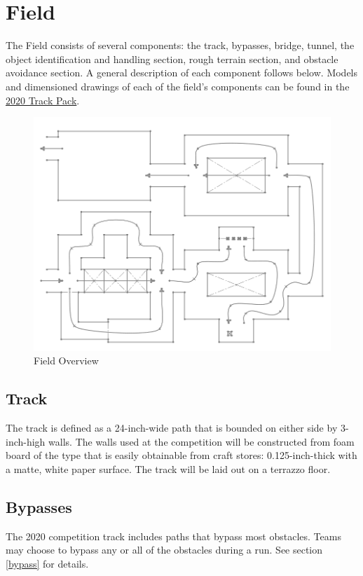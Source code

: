 \section{Field}
The Field consists of several components: the track, bypasses, bridge, tunnel, the object identification and handling section, rough terrain section, and obstacle avoidance section. A general description of each component follows below. Models and dimensioned drawings of each of the field’s components can be found in the {\href{https://mercury.okstate.edu/content/mercury-challenge}{2020 Track Pack}}.

\begin{figure}[H]
	\centering
	\includegraphics[width=.85\textwidth]{images/track_overview_wlabels.png}
	\caption{Field Overview}
	\label{fig:field} 
\end{figure}

\subsection{Track}
The track is defined as a 24-inch-wide path that is bounded on either side by 3-inch-high walls. The walls used at the competition will be constructed from foam board of the type that is easily obtainable from craft stores: 0.125-inch-thick with a matte, white paper surface. The track will be laid out on a terrazzo floor.

\subsection{Bypasses}
The 2020 competition track includes paths that bypass most obstacles. Teams may choose to bypass any or all of the obstacles during a run. See section \ref{bypass} for details.

